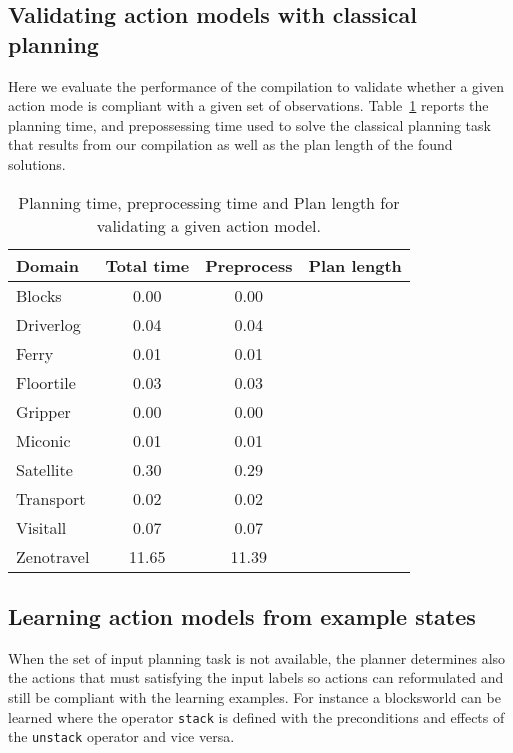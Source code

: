 \documentclass[letterpaper]{article} %
\begin{document}
\subsection{Validating action models with classical planning}
Here we evaluate the performance of the compilation to validate whether a given action mode is compliant with a given set of observations. Table~\ref{tab:time_plans_val} reports the planning time, and prepossessing time used to solve the classical planning task that results from our compilation as well as the plan length of the found solutions.
\begin{table}[hbt!]
\begin{small}
	\begin{center}
		\begin{tabular}{l|c|c|r|}			 
			Domain & Total time & Preprocess & Plan length  \\
			\hline
			Blocks & 0.00 & 0.00 \\
			Driverlog & 0.04 & 0.04 \\
			Ferry & 0.01 & 0.01 \\
			Floortile & 0.03 & 0.03 \\
			Gripper & 0.00 & 0.00 \\
			Miconic & 0.01 & 0.01 \\
			Satellite & 0.30 & 0.29 \\
			Transport & 0.02 & 0.02 \\
			Visitall & 0.07 & 0.07  \\
			Zenotravel & 11.65 & 11.39 			
		\end{tabular}
	\end{center}
        \end{small}
	\caption{\small Planning time, preprocessing time and Plan length for validating a given action model.}
	\label{tab:time_plans_val}	
\end{table}


\subsection{Learning action models from example states}
When the set of input planning task is not available, the planner determines also the actions that must satisfying the input labels so actions can reformulated and still be compliant with the learning examples. For instance a blocksworld can be learned where the operator {\small\tt stack} is defined with the preconditions and effects of the {\small\tt unstack} operator and vice versa. 
\end{document}

